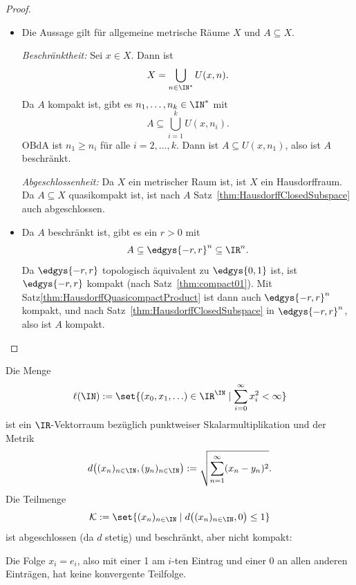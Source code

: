\documentclass[language=ngerman]{TemplateLecture} %
\begin{document}
\begin{proof}\leavevmode
    \begin{itemize}
        \item[\enquote{$\Rightarrow$}:] Die Aussage gilt für allgemeine metrische Räume $X$ und $A \subseteq X$.

        \emph{Beschränktheit:} Sei $x \in X$. Dann ist
        \begin{equation*}
            X = \bigcup_{n \in \IN^*} U(x,n).
        \end{equation*}
        Da $A$ kompakt ist, gibt es $n_1, \ldots, n_k \in \IN^*$ mit 
        \begin{equation*}
            A \subseteq \bigcup_{i = 1}^k U(x,n_i).
        \end{equation*}
        OBdA ist $n_1 \geq n_i$ für alle $i = 2,\ldots,k$. Dann ist $A \subseteq U(x,n_1)$, also ist $A$ beschränkt.

        \emph{Abgeschlossenheit:} Da $X$ ein metrischer Raum ist, ist $X$ ein Hausdorffraum. Da $A \subseteq X$ quasikompakt ist, ist nach $A$ Satz~\ref{thm:HausdorffClosedSubspace} auch abgeschlossen.

        \item[\enquote{$\Leftarrow$}:] Da $A$ beschränkt ist, gibt es ein $r > 0$ mit 
        \begin{equation*}
            A \subseteq \edgys{-r,r}^n \subseteq \IR^n.
        \end{equation*}
        Da $\edgys{-r,r}$ topologisch äquivalent zu $\edgys{0,1}$ ist, ist $\edgys{-r,r}$ kompakt (nach Satz~\ref{thm:compact01}). Mit Satz\ref{thm:HausdorffQuasicompactProduct} ist dann auch $\edgys{-r,r}^n$ kompakt, und nach Satz~\ref{thm:HausdorffClosedSubspace} in $\edgys{-r,r}^n$, also ist $A$ kompakt.
    \end{itemize}
\end{proof}

\begin{example}
    Die Menge 
    \begin{equation*}
        \ell(\IN) := \set{(x_0, x_1, \ldots) \in \IR^\IN \mid \sum_{i = 0}^\infty x_i^2 < \infty}
    \end{equation*}
    ist ein $\IR$-Vektorraum bezüglich punktweiser Skalarmultiplikation und der Metrik 
    \begin{equation*}
        d\bigl((x_n)_{n \in \IN}, (y_n)_{n \in \IN}\bigr) := \sqrt{\sum_{n = 1}^\infty (x_n - y_n)^2}.
    \end{equation*}
    Die Teilmenge 
    \begin{equation*}
        \mathcal{K} := \set{(x_n)_{n \in \IN} \mid d\bigl((x_n)_{n \in \IN}, 0\bigr) \leq 1}
    \end{equation*}
    ist abgeschlossen (da $d$ stetig) und beschränkt, aber nicht kompakt:

    Die Folge $x_i = e_i$, also mit einer 1 am $i$-ten Eintrag und einer 0 an allen anderen Einträgen, hat keine konvergente Teilfolge.
\end{example}
\end{document}

